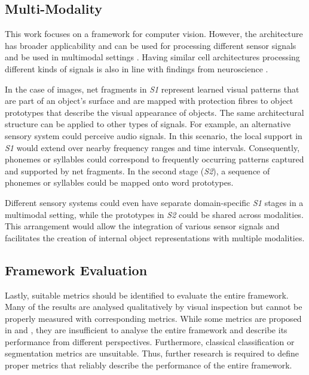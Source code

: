\subsection{Multi-Modality}
This work focuses on a framework for computer vision. However, the architecture has broader applicability and can be used for processing different sensor signals and be used in multimodal settings \cite{ngiam_multimodal_2011, liu_learn_2018, baltrusaitis_multimodal_2019}.
Having similar cell architectures processing different kinds of signals is also in line with findings from neuroscience .

In the case of images, net fragments in \emph{S1} represent learned visual patterns that are part of an object's surface and are mapped with protection fibres to object prototypes that describe the visual appearance of objects. 
The same architectural structure can be applied to other types of signals. For example, an alternative sensory system could perceive audio signals. In this scenario, the local support in \emph{S1} would extend over nearby frequency ranges and time intervals. Consequently, phonemes or syllables could correspond to frequently occurring patterns captured and supported by net fragments. In the second stage (\emph{S2}), a sequence of phonemes or syllables could be mapped onto word prototypes.

Different sensory systems could even have separate domain-specific \emph{S1} stages in a multimodal setting, while the prototypes in \emph{S2} could be shared across modalities. This arrangement would allow the integration of various sensor signals and facilitates the creation of internal object representations with multiple modalities.


\subsection{Framework Evaluation}
Lastly, suitable metrics should be identified to evaluate the entire framework. Many of the results are analysed qualitatively by visual inspection but cannot be properly measured with corresponding metrics.
While some metrics are proposed in  and , they are insufficient to analyse the entire framework and describe its performance from different perspectives.
Furthermore, classical classification or segmentation metrics are unsuitable.
Thus, further research is required to define proper metrics that reliably describe the performance of the entire framework.






